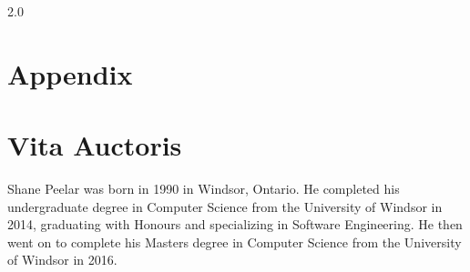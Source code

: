 \documentclass[fleqn, oneside, 12pt]{book}
\theoremstyle{definitionsty}
\newcommand{\uwindoublespacelen}{2.0}
\newcommand{\uwindefaultspacelen}{\uwindoublespacelen}
\newenvironment{uwindefaultspaceenv}%
{\begin{spacing}{\uwindefaultspacelen}}%
	{\end{spacing}}
\begin{document}
\begin{uwindefaultspaceenv}

\listoffigures

\clearpage

\listoftables
\clearpage

\listoftheorems[ignoreall,show={definition}]
\clearpage













\printbibliography[heading=bibintoc]

\chapter*{Appendix}

\chapter*{Vita Auctoris}

Shane Peelar was born in 1990 in Windsor, Ontario.  He completed his undergraduate degree in Computer Science from the University of Windsor in 2014, graduating with Honours and specializing in Software Engineering.  He then went on to complete his Masters degree in Computer Science from the University of Windsor in 2016.

\end{uwindefaultspaceenv}
\end{document}
